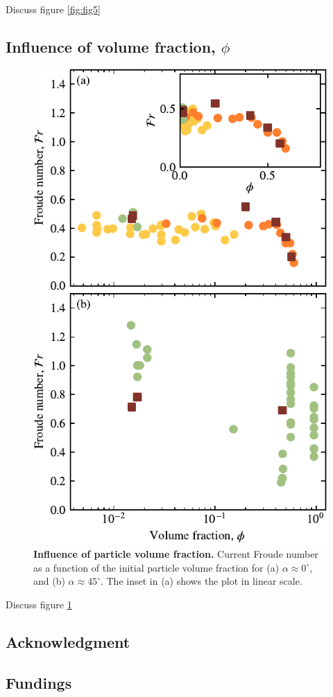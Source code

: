 \documentclass[twocolumn]{article}
\begin{document}
Discuss figure \ref{fig:fig5}

\subsection{Influence of volume fraction, $\phi$}
\label{sec:influence_phi}

\begin{figure}
	\centering
	\includegraphics{figure6.pdf}
	\caption{\textbf{Influence of particle volume fraction.} Current Froude number as a function of the initial particle volume fraction for (a) $\alpha \approx 0^\circ$, and (b) $\alpha \approx 45^\circ$. The inset in (a) shows the plot in linear scale.}
	\label{fig:fig6}
\end{figure}

Discuss figure \ref{fig:fig6}


\subsection*{Acknowledgment}

\subsection*{Fundings}






\newpage
\end{document}
